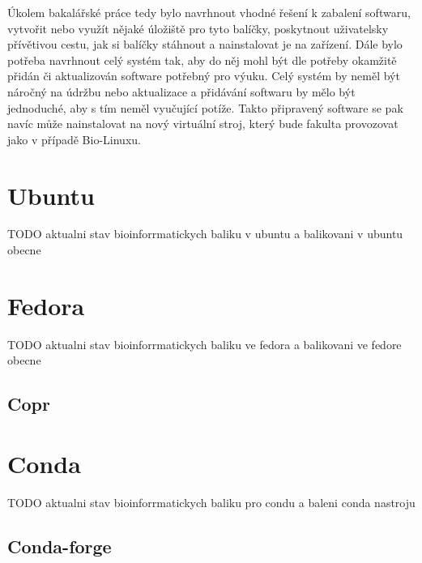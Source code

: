 \documentclass[
  digital,     %
  oneside,     %
  nosansbold,  %
  nocolorbold, %
  lof,         %
  lot,         %
]{fithesis4}
\begin{document}
Úkolem bakalářské práce tedy bylo navrhnout vhodné řešení k
zabalení softwaru, vytvořit nebo využít nějaké úložiště pro tyto balíčky,
poskytnout uživatelsky přívětivou cestu, jak si balíčky stáhnout a nainstalovat je
na zařízení. Dále bylo potřeba navrhnout celý systém tak, aby do něj mohl být dle
potřeby okamžitě přidán či aktualizován software potřebný pro výuku. Celý systém
by neměl být náročný na údržbu nebo aktualizace a přidávání softwaru by mělo být
jednoduché, aby s tím neměl vyučující potíže. Takto připravený software se pak
navíc může nainstalovat na nový virtuální stroj, který bude fakulta provozovat
jako v případě Bio-Linuxu.


\section{Ubuntu}

TODO aktualni stav bioinforrmatickych baliku v ubuntu a balikovani v ubuntu obecne



\section{Fedora}

TODO aktualni stav bioinforrmatickych baliku ve fedora a balikovani ve fedore obecne


\subsection{Copr}
\label{item:1.3.1}


\section{Conda}

TODO aktualni stav bioinforrmatickych baliku pro condu a baleni conda nastroju


\subsection{Conda-forge}


\end{document}
